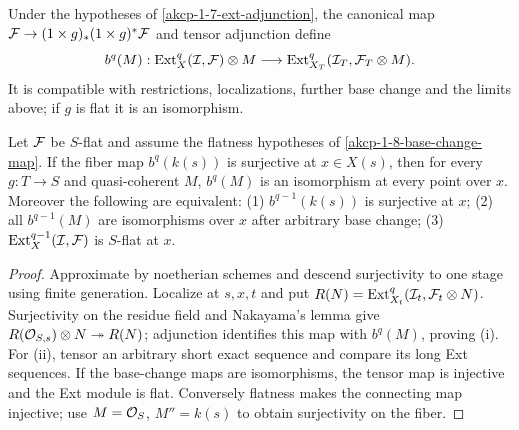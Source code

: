 \begin{definition}
\label{akcp-1-8-base-change-map}
Under the hypotheses of \cref{akcp-1-7-ext-adjunction}, the canonical map
$\mathcal F\to(1\times g)_*(1\times g)^*\mathcal F$ and tensor adjunction define
\[
b^q(M):\operatorname{Ext}_X^q(\mathcal I,\mathcal F)\otimes M\longrightarrow
\operatorname{Ext}_{X_T}^q(\mathcal I_T,\mathcal F_T\otimes M).
\]
It is compatible with restrictions, localizations, further base change and the
limits above; if $g$ is flat it is an isomorphism.
\end{definition}

\begin{theorem}
\label{akcp-1-9-exchange}
Let $\mathcal F$ be $S$-flat and assume the flatness hypotheses of
\cref{akcp-1-8-base-change-map}.  If the fiber map
$b^q(k(s))$ is surjective at $x\in X(s)$, then for every $g:T\to S$ and
quasi-coherent $M$, $b^q(M)$ is an isomorphism at every point over $x$.
Moreover the following are equivalent: (1) $b^{q-1}(k(s))$ is surjective at
$x$; (2) all $b^{q-1}(M)$ are isomorphisms over $x$ after arbitrary base change;
(3) $\operatorname{Ext}_X^{q-1}(\mathcal I,\mathcal F)$ is $S$-flat at $x$.
\end{theorem}
\begin{proof}
Approximate by noetherian schemes and descend surjectivity to one stage using
finite generation.  Localize at $s,x,t$ and put
$R(N)=\operatorname{Ext}^q_{X_t}(\mathcal I_t,\mathcal F_t\otimes N)$.  Surjectivity on the residue
field and Nakayama's lemma give $R(\mathcal O_{S,s})\otimes N\twoheadrightarrow R(N)$;
adjunction identifies this map with $b^q(M)$, proving (i).  For (ii), tensor an
arbitrary short exact sequence and compare its long Ext sequences.  If the
base-change maps are isomorphisms, the tensor map is injective and the Ext
module is flat.  Conversely flatness makes the connecting map injective; use
$M=\mathcal O_S$, $M''=k(s)$ to obtain surjectivity on the fiber.\end{proof}

